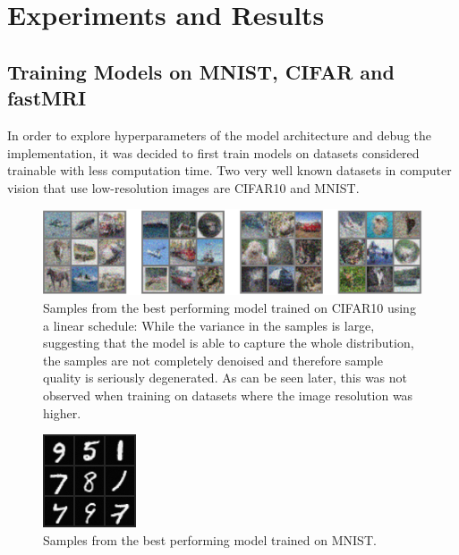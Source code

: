 %
\newpage
\chapter{Experiments and Results}
\label{sec:experimentsandresults}
\section{Training Models on MNIST, CIFAR and fastMRI}
In order to explore hyperparameters of the model architecture and debug the implementation, it was decided to first train models on datasets considered trainable with less computation time. Two very well known datasets in computer vision that use low-resolution images are CIFAR10 and MNIST.~\autocite{cifar,mnist}
\begin{figure}[h]
    \centering
    \includegraphics[width=.75\textwidth]{images/cifarsamples.png}
    \caption[Samples generated from CIFAR10]{Samples from the best performing model trained on CIFAR10 using a linear schedule: While the variance in the samples is large, suggesting that the model is able to capture the whole distribution, the samples are not completely denoised and therefore sample quality is seriously degenerated. As can be seen later, this was not observed when training on datasets where the image resolution was higher.}
    \label{fig:cifarsamples}
\end{figure}

\begin{figure}[h]
    \centering
    \includegraphics[width=.15\textwidth]{images/mnistsamples.png}
    \caption[Samples generated from MNIST]{Samples from the best performing model trained on MNIST.}
    \label{fig:mnistsamples}
\end{figure}

